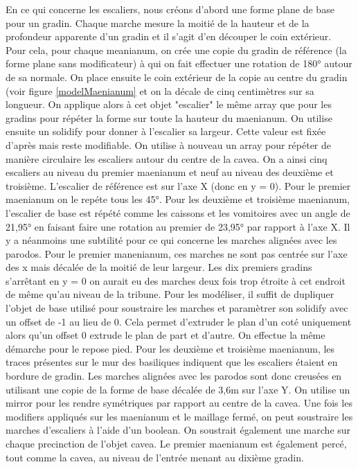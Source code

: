 En ce qui concerne les escaliers, nous créons d'abord une forme plane de base pour un gradin. Chaque marche mesure la moitié de la hauteur et de la profondeur apparente d'un gradin et il s'agit d'en découper le coin extérieur. Pour cela, pour chaque meanianum, on crée une copie du gradin de référence (la forme plane sans modificateur) à qui on fait effectuer une rotation de 180° autour de sa normale. On place ensuite le coin extérieur de la copie au centre du gradin (voir figure \ref{modelMaenianum} et on la décale de cinq centimètres sur sa longueur. On applique alors à cet objet "escalier" le même \gls{array} que pour les gradins pour répéter la forme sur toute la hauteur du maenianum. On utilise ensuite un \gls{solidify} pour donner à l'escalier sa largeur. Cette valeur est fixée d'après \cite[Pl. XIX]{orangePl} mais reste modifiable. On utilise à nouveau un \gls{array} pour répéter de manière circulaire les escaliers autour du centre de la cavea. On a ainsi cinq escaliers au niveau du premier maenianum et neuf au niveau des deuxième et troisième. L'escalier de référence est sur l'axe X (donc en y = 0). Pour le premier maenianum on le repéte tous les 45°. Pour les deuxième et troisième maenianum, l'escalier de base est répété comme les caissons et les vomitoires avec un angle de 21,95° en faisant faire une rotation au premier de 23,95° par rapport à l'axe X. Il y a néanmoins une subtilité pour ce qui concerne les marches alignées avec les \gls{parodos}. Pour le premier manenianum, ces marches ne sont pas centrée sur l'axe des x mais décalée de la moitié de leur largeur. Les dix premiers gradins s'arrêtant en y = 0 on aurait eu des marches deux fois trop étroite à cet endroit de même qu'au niveau de la tribune. Pour les modéliser, il suffit de dupliquer l'objet de base utilisé pour soustraire les marches et paramètrer son \gls{solidify} avec un offset de -1 au lieu de 0. Cela permet d'extruder le plan d'un coté uniquement alors qu'un offset 0 extrude le plan de part et d'autre. On effectue la même démarche pour le repose pied. Pour les deuxième et troisième maenianum, les traces présentes sur le mur des basiliques indiquent que les escaliers étaient en bordure de gradin. Les marches alignées avec les \gls{parodos} sont donc creusées en utilisant une copie de la forme de base décalée de 3,6m sur l'axe Y. On utilise un \gls{mirror} pour les rendre symétriques par rapport au centre de la cavea.
Une fois les modifiers appliqués sur les maenianum et le maillage fermé, on peut soustraire les marches d'escaliers à l'aide d'un \gls{boolean}. On soustrait également une marche sur chaque precinction de l'objet cavea. Le premier maenianum est également percé, tout comme la cavea, au niveau de l'entrée menant au dixième gradin.


